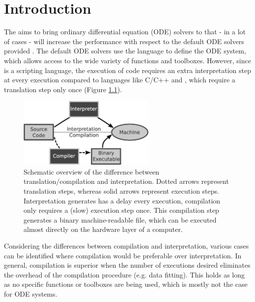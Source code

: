 \chapter[Introduction]{Introduction}
The \PPODESUITE aims to bring ordinary differential equation (ODE) solvers to \MATLAB that - in a lot of cases - will increase the performance with respect to the default ODE solvers provided \MATLAB. The default \MATLAB ODE solvers use the \MATLAB language to define the ODE system, which allows access to the wide variety of \MATLAB functions and toolboxes. However, since \MATLAB is a scripting language, the execution of \MATLAB code requires an extra interpretation step at every execution compared to languages like C/C++ and \Fortran, which require a translation step only once (Figure \ref{fig:InterpretationVSCompilation}).
\begin{figure}[hb]
 \centering
 \includegraphics[width=0.6\textwidth]{./graphics/interpreter-vs-compiler.eps}
 \caption{Schematic overview of the difference between translation/compilation and interpretation. Dotted arrows represent translation steps, whereas solid arrows represent execution steps. Interpretation generates has a delay every execution, compilation only requires a (slow) execution step once. This compilation step generates a binary machine-readable file, which can be executed almost directly on the hardware layer of a computer.}
 \label{fig:InterpretationVSCompilation}
\end{figure}

Considering the differences between compilation and interpretation, various cases can be identified where compilation would be preferable over interpretation. In general, compilation is superior when the number of executions desired eliminates the overhead of the compilation procedure (e.g. data fitting). This holds as long as no \MATLAB specific functions or toolboxes are being used, which is mostly not the case for ODE systems.



